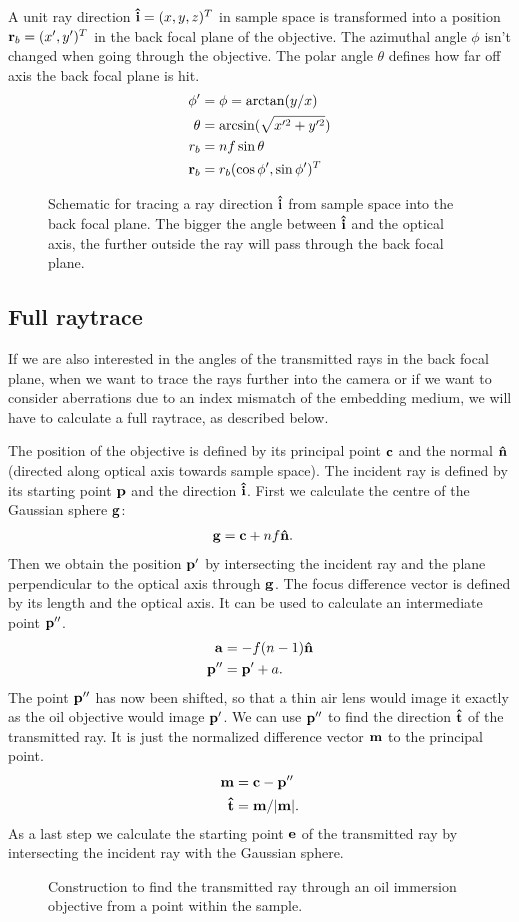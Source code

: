 A unit ray direction $\mathbf{\hat{i}}=(x,y,z)^T$ in sample space is transformed
into a position $\mathbf{r}_b=(x',y')^T$ in the back focal plane of the
objective. The azimuthal angle $\phi$ isn't changed when going through
the objective. The polar angle $\theta$ defines how far off axis the
back focal plane is hit.
\begin{align}
  \phi'&=\phi=\arctan(y/x)\\
  \theta&=\arcsin(\sqrt{x'^2+y'^2})\\
  r_b&=nf\sin\theta\\
  \mathbf{r}_b&=r_b(\cos\phi',\sin\phi')^T
\end{align}
 \begin{figure}[!hbt]
   \centering
   
   \caption{Schematic for tracing a ray direction $\mathbf{\hat{i}}$ from sample
     space into the back focal plane. The bigger the angle between
     $\mathbf{\hat{i}}$ and the optical axis, the further outside the ray will pass
     through the back focal plane.}
 \end{figure}
\subsection{Full raytrace}
If we are also interested in the angles of the transmitted rays in the
back focal plane, when we want to trace the rays further into the
camera or if we want to consider aberrations due to an index mismatch
of the embedding medium, we will have to calculate a full raytrace, as
described below.

The position of the objective is defined by its principal point $\mathbf{c}$
and the normal $\mathbf{\hat{n}}$ (directed along optical axis towards sample
space). The incident ray is defined by its starting point $\mathbf{p}$ and the
direction $\mathbf{\hat{i}}$. First we calculate the centre of the Gaussian sphere
$\mathbf{g}$:
\begin{align}
  \mathbf{g} &= \mathbf{c} + nf \mathbf{\hat{n}}.
\end{align}
Then we obtain the position $\mathbf{p}'$ by intersecting the incident ray and
the plane perpendicular to the optical axis through $\mathbf{g}$.  The focus
difference vector is defined by its length and the optical axis. It
can be used to calculate an intermediate point $\mathbf{p}''$.
\begin{align}
  \mathbf{a} &= -f(n-1)\mathbf{\hat{n}} \\
  \mathbf{p}'' &= \mathbf{p}' + a.
\end{align}
The point $\mathbf{p}''$ has now been shifted, so that a thin air lens would
image it exactly as the oil objective would image $\mathbf{p}'$. We can use
$\mathbf{p}''$ to find the direction $\mathbf{\hat{t}}$ of the transmitted ray. It is just
the normalized difference vector $\mathbf{m}$ to the principal point.
\begin{align}
  \mathbf{m} &= \mathbf{c} - \mathbf{p}'' \\
  \mathbf{\hat{t}} &= \mathbf{m} / \mathopen| \mathbf{m} \mathclose|.
\end{align}
As a last step we calculate the starting point $\mathbf{e}$ of the transmitted
ray by intersecting the incident ray with the Gaussian sphere.
\begin{figure}[!hbt]
  \centering
  
  \caption{Construction to find the transmitted ray through an oil
    immersion objective from a point within the sample.}
  \label{fig:obj-ref-full}
\end{figure}
